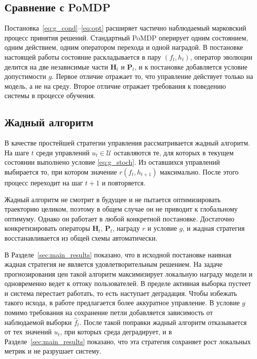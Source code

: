 \documentclass[a4paper,14pt,oneside,openany]{extarticle}
\newcommand{\bH}{\mathbf{H}}
\newcommand{\bP}{\mathbf{P}}
\newcommand{\cU}{\mathcal{U}}
\begin{document}
\subsection{Сравнение с PoMDP}

Постановка~\eqref{eq:g_cond}--\eqref{eq:opt} расширяет частично наблюдаемый марковский процесс принятия решений. Стандартный PoMDP оперирует одним состоянием, одним действием, одним оператором перехода и одной наградой. В постановке настоящей работы состояние раскладывается в пару $(f_t, h_t)$, оператор эволюции делится на две независимые части $\bH_t$ и $\bP_t$, и к постановке добавляется условие допустимости $g$. Первое отличие отражает то, что управление действует только на модель, а не на среду. Второе отличие отражает требования к поведению системы в процессе обучения.

\subsection{Жадный алгоритм}\label{sec:greedy}

В качестве простейшей стратегии управления рассматривается жадный алгоритм. На шаге $t$ среди управлений $u_t \in \cU$ оставляются те, для которых в текущем состоянии выполнено условие \eqref{eq:g_stoch}. Из оставшихся управлений выбирается то, при котором значение $r(f_t, h_{t+1})$ максимально. После этого процесс переходит на шаг $t + 1$ и повторяется.

Жадный алгоритм не смотрит в будущее и не пытается оптимизировать траекторию целиком, поэтому в общем случае он не приводит к глобальному оптимуму. Однако он работает в любой конкретной постановке. Достаточно конкретизировать операторы $\bH_t$, $\bP_t$, награду $r$ и условие $g$, и жадная стратегия восстанавливается из общей схемы автоматически.

В Разделе~\ref{sec:main_results} показано, что в исходной постановке наивная жадная стратегия не является удовлетворительным решением. На задаче прогнозирования цен такой алгоритм максимизирует локальную награду модели и одновременно ведет к оттоку пользователей. В пределе активная выборка пустеет и система перестает работать, то есть наступает деградация. Чтобы избежать такого исхода, в работе предлагается более аккуратное управление. В условие $g$ помимо требования на сохранение петли добавляется зависимость от наблюдаемой выборки $\hat f_t$. После такой поправки жадный алгоритм отказывается от тех значений $u_t$, при которых среда деградирует, и в Разделе~\ref{sec:main_results} показано, что эта стратегия сохраняет рост локальных метрик и не разрушает систему.
\end{document}
